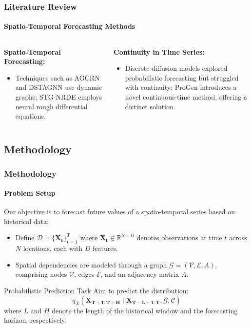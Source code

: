 \documentclass[light]{lutbeamer} %
\begin{document}
\begin{frame}
    \frametitle{Literature Review}
    \framesubtitle{Spatio-Temporal Forecasting Methods}

    \begin{columns}[T]
        \begin{column}{0.48\textwidth}
            \textbf{Spatio-Temporal Forecasting:}
            \begin{itemize}
                \item Techniques such as AGCRN and DSTAGNN use dynamic graphs; STG-NRDE employs neural rough differential equations.
            \end{itemize}
        \end{column}
        \begin{column}{0.48\textwidth}
            \textbf{Continuity in Time Series:}
            \begin{itemize}
                \item Discrete diffusion models explored probabilistic forecasting but struggled with continuity; ProGen introduces a novel continuous-time method, offering a distinct solution.
            \end{itemize}
        \end{column}
    \end{columns}
\end{frame}


\subsection{Methodology}
\begin{frame}
    \frametitle{Methodology}
    \framesubtitle{Problem Setup}

    Our objective is to forecast future values of a spatio-temporal series based on historical data:
    \begin{itemize}
        \item Define \(\mathcal{D} = \{\mathbf{X_t}\}_{t=1}^T\) where \(\mathbf{X_t} \in \mathbb{R}^{N \times D}\) denotes observations at time \(t\) across \(N\) locations, each with \(D\) features.
        \item Spatial dependencies are modeled through a graph \(\mathcal{G} = (\mathcal{V}, \mathcal{E}, A)\), comprising nodes \(\mathcal{V}\), edges \(\mathcal{E}\), and an adjacency matrix \(A\).
    \end{itemize}
    \vspace{-0.65em}
    \begin{block}{Probabilistic Prediction Task}
        Aim to predict the distribution:
        \[
            q_X (\mathbf{X_{T+1:T+H}} \mid \mathbf{X_{T-L+1:T}}, \mathcal{G}, \mathcal{C})
        \]
        where \(L\) and \(H\) denote the length of the historical window and the forecasting horizon, respectively.
    \end{block}
\end{frame}
\end{document}
